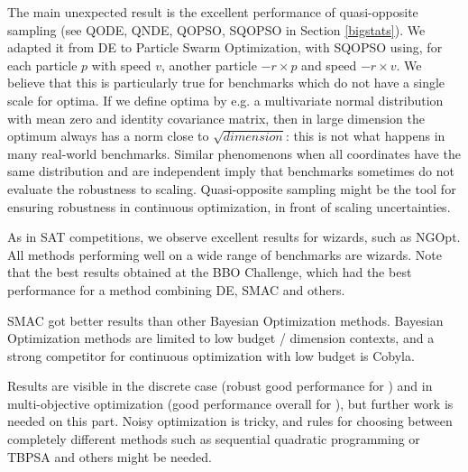 

The main unexpected result is the excellent performance of quasi-opposite sampling\cite{quasiopposite} (see QODE, QNDE,
QOPSO, SQOPSO in Section \ref{bigstats}). We adapted it
from DE to Particle Swarm Optimization, with SQOPSO using, for each particle $p$ with speed $v$, another particle
$-r\times p$ and speed $-r\times v$. We believe that this is particularly true for benchmarks which do not have a single
scale for optima. If we define optima by e.g. a multivariate normal distribution with mean zero and identity covariance matrix, then
in large dimension the optimum always has a norm close to $\sqrt{dimension}$: this is not what happens in many
real-world benchmarks. Similar phenomenons when all coordinates have the same distribution and are independent imply
that benchmarks sometimes do not evaluate the robustness to scaling. Quasi-opposite sampling might be the tool for
ensuring robustness in continuous optimization, in front of scaling uncertainties.

As in SAT competitions, we observe excellent results for wizards, such as NGOpt. All methods performing well on a wide
range of benchmarks are wizards. Note that the best results obtained at the BBO Challenge\cite{bbochallenge}, which had
the best performance for a method combining DE, SMAC and others.

SMAC got better results than other Bayesian Optimization methods. Bayesian Optimization methods are limited to low
budget / dimension contexts, and a strong competitor for continuous optimization with low budget is Cobyla.

Results are visible in the discrete case (robust good performance for \cite{relengler,lengler}) and in multi-objective
optimization (good performance overall for \cite{pde,mode}), but further work is needed on this part. Noisy optimization
is tricky, and rules for choosing between completely different methods such as sequential quadratic programming or
TBPSA\cite{vasilfoga} and others might be needed.




